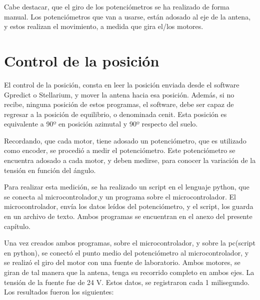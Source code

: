 Cabe destacar, que el giro de los potenciómetros se ha realizado de forma manual. Los potenciómetros que van a usarse, están adosado al eje de la antena, y estos realizan el movimiento, a medida que gira el/los motores.  

\section{Control de la posición}
El control de la posición, consta en leer la posición enviada desde el software Gpredict o Stellarium, y mover la antena hacia esa posición. Además, si no recibe, ninguna posición de estos programas, el software, debe ser capaz de regresar a la posición de equilibrio, o denominada cenit. Esta posición es equivalente a 90º en posición azimutal y 90º respecto del suelo. 

Recordando, que cada motor, tiene adosado un potenciómetro, que es utilizado como encoder, se procedió a medir el potenciómetro. Este potenciómetro se encuentra adosado a cada motor, y deben medirse, para conocer la variación de la tensión en función del ángulo. 

Para realizar esta medición, se ha realizado un script en el lenguaje python, que se conecta al microcontrolador,y un programa sobre el microcontrolador. El microcontrolador, envía los datos leídos del potenciómetro, y el script, los guarda en un archivo de texto. Ambos programas se encuentran en el anexo del presente capítulo.

Una vez creados ambos programas, sobre el microcontrolador, y sobre la pc(script en python), se conectó el punto medio del potenciómetro al microcontrolador, y se realizó el giro del motor con una fuente de laboratorio. Ambos motores, se giran de tal manera que la antena, tenga su recorrido completo en ambos ejes. La tensión de la fuente fue de 24 V. Estos datos, se registraron cada 1 milisegundo. Los resultados fueron los siguientes: 


